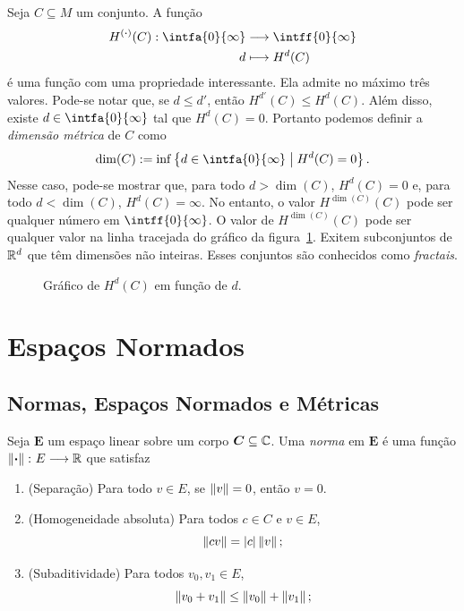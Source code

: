 Seja $C \subseteq M$ um conjunto. A função
	\begin{align*}
	\func{H^{(\var)}(C)}{\intfa{0}{\infty}}{\intff{0}{\infty}}{d}{H^d(C)}
	\end{align*}
é uma função com uma propriedade interessante. Ela admite no máximo três valores. Pode-se notar que, se $d \leq d'$, então $H^{d'}(C) \leq H^d(C)$. Além disso, existe $d \in \intfa{0}{\infty}$ tal que $H^d(C) = 0$. Portanto podemos definir a \emph{dimensão métrica} de $C$ como
	\begin{equation*}
	\dim(C) := \inf\set{d \in \intfa{0}{\infty}}{H^d(C)=0}.
	\end{equation*}
Nesse caso, pode-se mostrar que, para todo $d>\dim(C)$, $H^d(C) = 0$ e, para todo $d < \dim(C)$, $H^d(C) = \infty$. No entanto, o valor $H^{\dim(C)}(C)$ pode ser qualquer número em $\intff{0}{\infty}$. O valor de $H^{\dim(C)}(C)$ pode ser qualquer valor na linha tracejada do gráfico da figura~\ref{fig:dimensaometrica}. Exitem subconjuntos de $\mathbb{R}^d$ que têm dimensões não inteiras. Esses conjuntos são conhecidos como \emph{fractais}.

\begin{figure}
\centering
{}
\caption{Gráfico de $H^d(C)$ em função de $d$.}
\label{fig:dimensaometrica}
\end{figure}







\chapter{Espaços Normados}

\section{Normas, Espaços Normados e Métricas}

\begin{defi}
Seja $\bm E$ um espaço linear sobre um corpo $\bm C \subseteq \mathbb{C}$. Uma \emph{norma} em $\bm E$ é uma função $\left\Vert{\bm{\cdot}}\right\Vert\colon E \longrightarrow \mathbb{R}$
que satisfaz
	\begin{enumerate}
	\item (Separação) Para todo $v \in E$, se $\left\Vert{v}\right\Vert=0$, então $v=0$.
	\item (Homogeneidade absoluta) Para todos $c \in C$ e $v \in E$,
		\begin{equation*}
		\left\Vert{cv}\right\Vert = \left\vert{c}\right\vert\left\Vert{v}\right\Vert;
		\end{equation*}
	\item (Subaditividade) Para todos $v_0,v_1 \in E$,
		\begin{equation*}
		\left\Vert{v_0 + v_1}\right\Vert \leq \left\Vert{v_0}\right\Vert + \left\Vert{v_1}\right\Vert;
		\end{equation*}
	\end{enumerate}
\end{defi}


